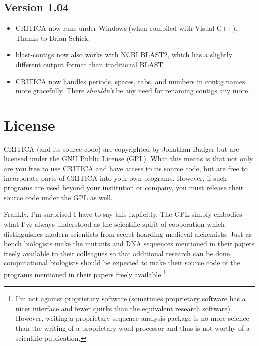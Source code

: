 \documentclass{article}
\begin{document}
\subsection*{Version 1.04}

\begin{itemize}

\item CRITICA now runs under Windows (when compiled with Visual
C++). Thanks to Brian Schick.

\item blast-contigs now also works with NCBI BLAST2, which has a
slightly different output format than traditional BLAST.

\item CRITICA now handles periods, spaces, tabs, and numbers in contig
names more gracefully. There {\em shouldn't} be any need for renaming 
contigs any more.

\end{itemize}

\section{License}

CRITICA (and its source code) are copyrighted by Jonathan Badger but
are licensed under the GNU Public License (GPL). What this means is
that not only are you free to use CRITICA and have access to its
source code, but are free to incorporate parts of CRITICA into your
own programs. However, if such programs are used beyond your
institution or company, you must release their source code under the
GPL as well.

Frankly, I'm surprised I have to say this explicitly. The GPL simply
embodies what I've always understood as the scientific spirit of
cooperation which distinguishes modern scientists from secret-hoarding
medieval alchemists. Just as bench biologists make the mutants and DNA
sequences mentioned in their papers freely available to their
colleagues so that additional research can be done, computational
biologists should be expected to make their source code of the
programs mentioned in their papers freely available \footnote{I'm not
against proprietary software (sometimes proprietary software has a
nicer interface and fewer quirks than the equivalent research
software). However, writing a proprietary sequence analysis package is
no more science than the writing of a proprietary word processor and
thus is not worthy of a scientific publication.}
\end{document}
